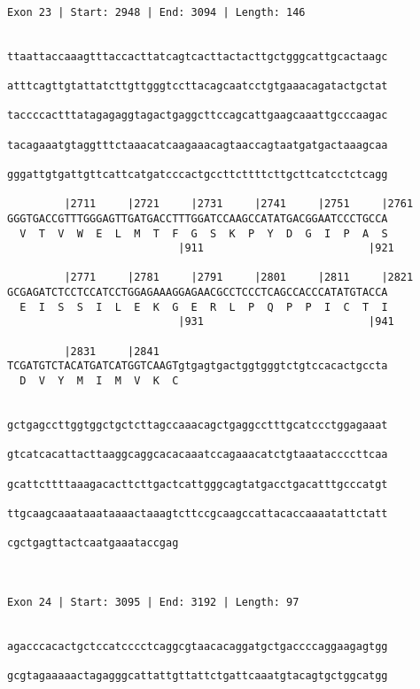 \documentclass{article}
\begin{document}
\begin{Verbatim}
 
Exon 23 | Start: 2948 | End: 3094 | Length: 146


ttaattaccaaagtttaccacttatcagtcacttactacttgctgggcattgcactaagc

atttcagttgtattatcttgttgggtccttacagcaatcctgtgaaacagatactgctat

taccccactttatagagaggtagactgaggcttccagcattgaagcaaattgcccaagac

tacagaaatgtaggtttctaaacatcaagaaacagtaaccagtaatgatgactaaagcaa

gggattgtgattgttcattcatgatcccactgccttcttttcttgcttcatcctctcagg

         |2711     |2721     |2731     |2741     |2751     |2761
GGGTGACCGTTTGGGAGTTGATGACCTTTGGATCCAAGCCATATGACGGAATCCCTGCCA
  V  T  V  W  E  L  M  T  F  G  S  K  P  Y  D  G  I  P  A  S
                           |911                          |921
  
         |2771     |2781     |2791     |2801     |2811     |2821
GCGAGATCTCCTCCATCCTGGAGAAAGGAGAACGCCTCCCTCAGCCACCCATATGTACCA
  E  I  S  S  I  L  E  K  G  E  R  L  P  Q  P  P  I  C  T  I
                           |931                          |941
  
         |2831     |2841                                    
TCGATGTCTACATGATCATGGTCAAGTgtgagtgactggtgggtctgtccacactgccta
  D  V  Y  M  I  M  V  K  C                                 
                                                          
  
gctgagccttggtggctgctcttagccaaacagctgaggcctttgcatccctggagaaat
                                                            
gtcatcacattacttaaggcaggcacacaaatccagaaacatctgtaaataccccttcaa
                                                            
gcattcttttaaagacacttcttgactcattgggcagtatgacctgacatttgcccatgt
                                                            
ttgcaagcaaataaataaaactaaagtcttccgcaagccattacaccaaaatattctatt
                                                            
cgctgagttactcaatgaaataccgag
                           
                           
 
Exon 24 | Start: 3095 | End: 3192 | Length: 97


agacccacactgctccatcccctcaggcgtaacacaggatgctgaccccaggaagagtgg
                                                            
gcgtagaaaaactagagggcattattgttattctgattcaaatgtacagtgctggcatgg
                                                            

\end{Verbatim}
\end{document}
